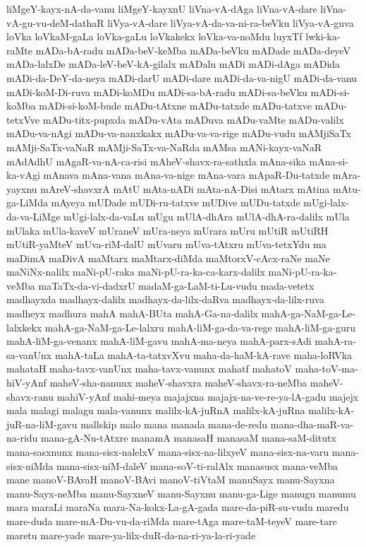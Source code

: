 {liMgeY-kayx-nA-da-vanu
liMgeY-kayxnU
liVna-vA-dAga
liVna-vA-dare
liVna-vA-gu-vu-deM-dathaR
liVya-vA-dare
liVya-vA-da-va-ni-ra-beVku
liVya-vA-guva
loVka
loVkaM-gaLa
loVka-gaLu
loVkakekx
loVka-va-noMdu
luyxTf
lwki-ka-raMte
mADa-bA-radu
mADa-beV-keMba
mADa-beVku
mADade
mADa-deyeV
mADa-lalxDe
mADa-leV-beV-kA-gilalx
mADalu
mADi
mADi-dAga
mADida
mADi-da-DeY-da-neya
mADi-darU
mADi-dare
mADi-da-va-nigU
mADi-da-vanu
mADi-koM-Di-ruva
mADi-koMDu
mADi-sa-bA-radu
mADi-sa-beVku
mADi-si-koMba
mADi-si-koM-bude
mADu-tAtxne
mADu-tatxde
mADu-tatxve
mADu-tetxVve
mADu-titx-pupxda
mADu-vAta
mADuva
mADu-vaMte
mADu-valilx
mADu-va-nAgi
mADu-va-nanxkakx
mADu-va-va-rige
mADu-vudu
mAMjiSaTx
mAMji-SaTx-vaNaR
mAMji-SaTx-va-NaRda
mAMsa
mANi-kayx-vaNaR
mAdAdhU
mAgaR-va-nA-ca-risi
mAheV-shavx-ra-sathxla
mAna-sika
mAna-si-ka-vAgi
mAnava
mAna-vana
mAna-va-nige
mAna-vara
mApaR-Du-tatxde
mAra-yayxnu
mAreV-shavxrA
mAtU
mAta-nADi
mAta-nA-Disi
mAtarx
mAtina
mAtu-ga-LiMda
mAyeya
mUDade
mUDi-ru-tatxve
mUDive
mUDu-tatxde
mUgi-lalx-da-va-LiMge
mUgi-lalx-da-vaLu
mUgu
mUlA-dhAra
mUlA-dhA-ra-dalilx
mUla
mUlaka
mUla-kaveV
mUraneV
mUra-neya
mUrara
mUru
mUtiR
mUtiRH
mUtiR-yaMteV
mUva-riM-dalU
mUvaru
mUva-tAtxru
mUva-tetxYdu
ma
maDimA
maDivA
maMtarx
maMtarx-diMda
maMtorxV-cAcx-raNe
maNe
maNiNx-nalilx
maNi-pU-raka
maNi-pU-ra-ka-ca-karx-dalilx
maNi-pU-ra-ka-veMba
maTaTx-da-vi-dadxrU
madaM-ga-LaM-ti-Lu-vudu
mada-vetetx
madhayxda
madhayx-dalilx
madhayx-da-lilx-daRva
madhayx-da-lilx-ruva
madheyx
madhura
mahA
mahA-BUta
mahA-Ga-na-dalilx
mahA-ga-NaM-ga-Le-lalxkekx
mahA-ga-NaM-ga-Le-lalxru
mahA-liM-ga-da-va-rege
mahA-liM-ga-guru
mahA-liM-ga-venanx
mahA-liM-gavu
mahA-ma-neya
mahA-parx-sAdi
mahA-ra-sa-vanUnx
mahA-taLa
mahA-ta-tatxvXvu
maha-da-haM-kA-rave
maha-loRVka
mahataH
maha-tavx-vanUnx
maha-tavx-vanunx
mahatf
mahatoV
maha-toV-ma-hiV-yAnf
maheV-sha-nanunx
maheV-shavxra
maheV-shavx-ra-neMba
maheV-shavx-ranu
mahiV-yAnf
mahi-meya
majajxna
majajx-na-ve-re-ya-lA-gadu
majejx
mala
malagi
malagu
mala-vanunx
malilx-kA-juRnA
malilx-kA-juRna
malilx-kA-juR-na-liM-gavu
mallskip
malo
mana
manada
mana-de-redu
mana-dha-maR-va-na-ridu
mana-gA-Nu-tAtxre
manamA
manasaH
manasaM
mana-saM-ditutx
mana-sasxnunx
mana-sisx-nalelxV
mana-sisx-na-lilxyeV
mana-sisx-na-varu
mana-sisx-niMda
mana-sisx-niM-daleV
mana-soV-ti-ralAlx
manasusx
mana-veMba
mane
manoV-BAvaH
manoV-BAvi
manoV-tiVtaM
manuSayx
manu-Sayxna
manu-Sayx-neMba
manu-SayxneV
manu-Sayxnu
manu-ga-Lige
manugu
manumu
mara
maraLi
maraNa
mara-Na-kokx-La-gA-gada
mare-da-piR-su-vudu
maredu
mare-duda
mare-mA-Du-vu-da-riMda
mare-tAga
mare-taM-teyeV
mare-tare
maretu
mare-yade
mare-ya-lilx-duR-da-na-ri-ya-la-ri-yade
}
